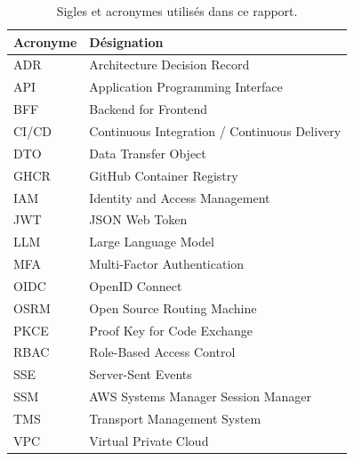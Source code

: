 \begin{table}[ht]
\centering
\caption{Sigles et acronymes utilisés dans ce rapport.}
\label{tab:sigles}
\begin{tabular}{@{}lp{10cm}@{}}
\toprule
Acronyme & Désignation \\
\midrule
ADR & Architecture Decision Record \\
API & Application Programming Interface \\
BFF & Backend for Frontend \\
CI/CD & Continuous Integration / Continuous Delivery \\
DTO & Data Transfer Object \\
GHCR & GitHub Container Registry \\
IAM & Identity and Access Management \\
JWT & JSON Web Token \\
LLM & Large Language Model \\
MFA & Multi-Factor Authentication \\
OIDC & OpenID Connect \\
OSRM & Open Source Routing Machine \\
PKCE & Proof Key for Code Exchange \\
RBAC & Role-Based Access Control \\
SSE & Server-Sent Events \\
SSM & AWS Systems Manager Session Manager \\
TMS & Transport Management System \\
VPC & Virtual Private Cloud \\
\bottomrule
\end{tabular}
\end{table}
